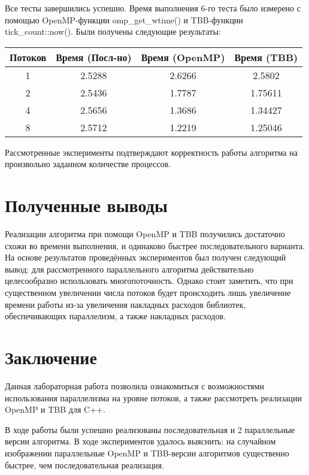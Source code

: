 \documentclass[14pt, russian]{extarticle}
\begin{document}
	\indent Все тесты завершились успешно. Время выполнения 6-го теста было измерено с помощью OpenMP-функции omp\_get\_wtime() и TBB-функции\\tick\_count::now(). Были получены следующие результаты:
	
	\begin{table}[ht]
		\centering
		\begin{tabular}{| c | c | c | c |}
			\hline
			Потоков & Время (Посл-но) & Время (OpenMP) & Время (TBB) \\ [0.5ex]
			\hline
			1 & 2.5288 & 2.6266 & 2.5802 \\
			\hline
			2 & 2.5436 & 1.7787 & 1.75611 \\
			\hline
			4 & 2.5656 & 1.3686 & 1.34427 \\
			\hline
			8 & 2.5712 & 1.2219 & 1.25046 \\
			\hline
		\end{tabular}
	\end{table}

	Рассмотренные эксперименты подтверждают корректность работы алгоритма на произвольно заданном количестве процессов.
	\newpage
	
	\section{Полученные выводы}
	Реализации алгоритма при помощи OpenMP и TBB получились достаточно схожи во времени выполнения, и одинаково быстрее последовательного варианта. На основе результатов проведённых экспериментов был получен следующий вывод: для рассмотренного параллельного алгоритма действительно целесообразно использовать многопоточность. Однако стоит заметить, что при существенном увеличении числа потоков будет происходить лишь увеличение времени работы из-за увеличения накладных расходов библиотек, обеспечивающих параллелизм, а также накладных расходов.
	\newpage
	
	\section{Заключение}
	Данная лабораторная работа позволила ознакомиться с возможностями использования параллелизма на уровне потоков, а также рассмотреть реализации OpenMP и TBB для C++.
	
	В ходе работы были успешно реализованы последовательная и 2 параллельные версии алгоритма. В ходе экспериментов удалось выяснить: на случайном изображении параллельные OpenMP и TBB-версии алгоритмов существенно быстрее, чем последовательная реализация.
\end{document}
